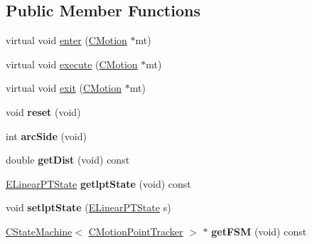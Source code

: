 \subsection*{Public Member Functions}
\begin{DoxyCompactItemize}
\item 
virtual void \mbox{\hyperlink{classmotion_1_1CMotionPointTracker_a77975b88cc198d7115910dd0e738f925}{enter}} (\mbox{\hyperlink{classmotion_1_1CMotion}{C\+Motion}} $\ast$mt)
\item 
virtual void \mbox{\hyperlink{classmotion_1_1CMotionPointTracker_a2513b0d052536d307db674af8ee8a3e6}{execute}} (\mbox{\hyperlink{classmotion_1_1CMotion}{C\+Motion}} $\ast$mt)
\item 
virtual void \mbox{\hyperlink{classmotion_1_1CMotionPointTracker_ae40c6dc8e2883a6293b2ea5994b0e3d1}{exit}} (\mbox{\hyperlink{classmotion_1_1CMotion}{C\+Motion}} $\ast$mt)
\item 
\mbox{\label{classmotion_1_1CMotionPointTracker_a6a3e63319c5059316543779904495599}} 
void {\bfseries reset} (void)
\item 
\mbox{\label{classmotion_1_1CMotionPointTracker_a2532e7afbf434af45d8cfa75551fde47}} 
int {\bfseries arc\+Side} (void)
\item 
\mbox{\label{classmotion_1_1CMotionPointTracker_add639f835d6ac5c35c84d0768a574c7c}} 
double {\bfseries get\+Dist} (void) const
\item 
\mbox{\label{classmotion_1_1CMotionPointTracker_a5b074c876ffd5432449ebaecc47fcc57}} 
\mbox{\hyperlink{motionEnums_8h_a5a442990f649a5e91cbd8205f16dabfc}{E\+Linear\+P\+T\+State}} {\bfseries getlpt\+State} (void) const
\item 
\mbox{\label{classmotion_1_1CMotionPointTracker_a94eb508c2a7f071d467b6ab91809dc8e}} 
void {\bfseries setlpt\+State} (\mbox{\hyperlink{motionEnums_8h_a5a442990f649a5e91cbd8205f16dabfc}{E\+Linear\+P\+T\+State}} s)
\item 
\mbox{\label{classmotion_1_1CMotionPointTracker_ab5044793c84311aa4d8bd5edd2e60d35}} 
\mbox{\hyperlink{classmotion_1_1CStateMachine}{C\+State\+Machine}}$<$ \mbox{\hyperlink{classmotion_1_1CMotionPointTracker}{C\+Motion\+Point\+Tracker}} $>$ $\ast$ {\bfseries get\+F\+SM} (void) const

\end{DoxyCompactItemize}
